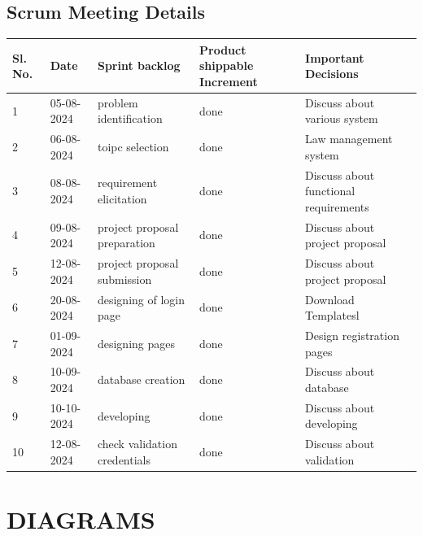 \section{Scrum Meeting Details}
%
\begin{center}
\begin{tabular}{|m{}|m{}|m{}|m{}|m{}|}
\hline
Sl. No. & Date & Sprint backlog & Product shippable Increment & Important Decisions \\
\hline
1 & 05-08-2024 & problem identification & done & Discuss about various system \\
\hline
2 & 06-08-2024 & toipc selection & done & Law management system \\
\hline
3 & 08-08-2024 & requirement elicitation & done & Discuss about functional requirements \\
\hline
4 & 09-08-2024 & project proposal preparation & done & Discuss about project proposal \\
\hline
5 & 12-08-2024 & project proposal submission & done & Discuss about project proposal \\
\hline
6 & 20-08-2024 & designing of login page & done & Download Templatesl \\
\hline
7 & 01-09-2024 & designing pages & done & Design registration pages \\
\hline
8 & 10-09-2024 & database creation & done & Discuss about database \\
\hline
9 & 10-10-2024 &developing & done & Discuss about developing \\
\hline
10 & 12-08-2024 & check validation credentials & done & Discuss about validation \\
\hline

\end{tabular}
\end{center}

\renewcommand{\arraystretch}{1}
%
%
\chapter{DIAGRAMS}
